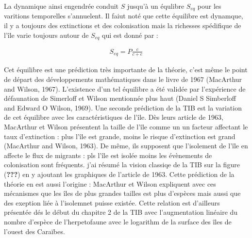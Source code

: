 La dynamique ainsi engendrée conduit \(S\) jusqu'à un équlibre
\(S_{eq}\) pour les varitions temporelles s'annuelent. Il faiut noté que
cette équilibre est dynamque, il y a toujours des extinctions et des
colonisation mais la richesses spédifique de l'île varie toujours autour
de \(S_{eq}\) qui est donné par :

\begin{eqnarray}
S_{eq} = P \frac{c}{c+e}
\end{eqnarray}

Cet équilibre est une prédiction très importante de la théorie, c'est
même le point de départ des développements mathématiques dans le livre
de 1967 (MacArthur and Wilson, 1967). L'existence d'un tel équilibre a
été validée par l'expérience de défaunation de Simerloff et Wilson
mentionnée plus haut (Daniel S Simberloff and Edward O Wilson, 1969).
Une seconde prédiction de la TIB est la variation de cet équilibre avec
les caractéristiques de l'île. Dès leurs article de 1963, MacArthur et
Wilson présentent la taille de l'île comme un un facteur affectant le
taux d'extinction : plus l'île est grande, moins le risque d'extinction
est grand (MacArthur and Wilson, 1963). De même, ils supposent que
l'isolement de l'île en affecte le flux de migrants : pls l'île est
isolée moins les évènements de colonisation sont fréquents. j'ai résumé
la vision classiqe de la TIB sur la figure ({\textbf{???}}) en y
ajoutant les graphiques de l'article de 1963. Cette prédiction de la
théorie en est aussi l'origine : MacArthur et Wilson expliquent avec ces
mécanismes que les îles de plus grandes tailles est plus d'espèces mais
aussi que des exeption liée à l'isolemnet puisse existée. Cette relation
est d'ailleurs présentée dés le début du chapitre 2 de la TIB avec
l'augmentation linéaire du nombre d'espèce de l'herpetofaune avec le
logarithm de la surface des îles de l'ouest des Caraïbes.

